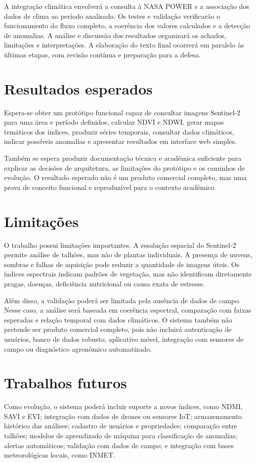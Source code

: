 A integração climática envolverá a consulta à NASA POWER e a associação dos dados de clima ao período analisado. Os testes e validação verificarão o funcionamento do fluxo completo, a coerência dos valores calculados e a detecção de anomalias. A análise e discussão dos resultados organizará os achados, limitações e interpretações. A elaboração do texto final ocorrerá em paralelo às últimas etapas, com revisão contínua e preparação para a defesa.

\section{Resultados esperados}

Espera-se obter um protótipo funcional capaz de consultar imagens Sentinel-2 para uma área e período definidos, calcular NDVI e NDWI, gerar mapas temáticos dos índices, produzir séries temporais, consultar dados climáticos, indicar possíveis anomalias e apresentar resultados em interface web simples.

Também se espera produzir documentação técnica e acadêmica suficiente para explicar as decisões de arquitetura, as limitações do protótipo e os caminhos de evolução. O resultado esperado não é um produto comercial completo, mas uma prova de conceito funcional e reproduzível para o contexto acadêmico.

\section{Limitações}

O trabalho possui limitações importantes. A resolução espacial do Sentinel-2 permite análise de talhões, mas não de plantas individuais. A presença de nuvens, sombras e falhas de aquisição pode reduzir a quantidade de imagens úteis. Os índices espectrais indicam padrões de vegetação, mas não identificam diretamente pragas, doenças, deficiência nutricional ou causa exata de estresse.

Além disso, a validação poderá ser limitada pela ausência de dados de campo. Nesse caso, a análise será baseada em coerência espectral, comparação com faixas esperadas e relação temporal com dados climáticos. O sistema também não pretende ser produto comercial completo, pois não incluirá autenticação de usuários, banco de dados robusto, aplicativo móvel, integração com sensores de campo ou diagnóstico agronômico automatizado.

\section{Trabalhos futuros}

Como evolução, o sistema poderá incluir suporte a novos índices, como NDMI, SAVI e EVI; integração com dados de drones ou sensores IoT; armazenamento histórico das análises; cadastro de usuários e propriedades; comparação entre talhões; modelos de aprendizado de máquina para classificação de anomalias; alertas automáticos; validação com dados de campo; e integração com bases meteorológicas locais, como INMET.
